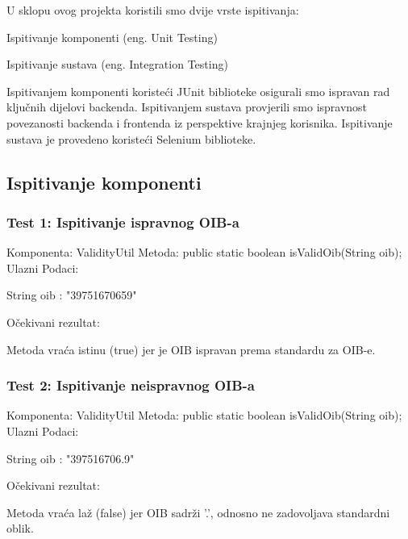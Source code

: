 			U sklopu ovog projekta koristili smo dvije vrste ispitivanja:
			\begin{packed_item}
				\item Ispitivanje komponenti (eng. Unit Testing)
				\item Ispitivanje sustava (eng. Integration Testing)
			\end{packed_item}
			
			
			Ispitivanjem komponenti koristeći JUnit biblioteke osigurali smo ispravan rad ključnih dijelovi backenda. Ispitivanjem sustava provjerili smo ispravnost povezanosti backenda i frontenda iz perspektive krajnjeg korisnika.
			Ispitivanje sustava je provedeno koristeći Selenium biblioteke.
			
			\subsection{Ispitivanje komponenti}
			\subsubsection*{Test 1: Ispitivanje ispravnog OIB-a}
			Komponenta: ValidityUtil \newline
			Metoda: public static boolean isValidOib(String oib); \newline
			Ulazni Podaci: 
			\begin{packed_item}
				\item String oib : "39751670659"
			\end{packed_item}
			Očekivani rezultat:
			\begin{packed_item}
				\item Metoda vraća istinu (true) jer je OIB ispravan prema standardu za OIB-e.
			\end{packed_item}
			

			\subsubsection*{Test 2: Ispitivanje neispravnog OIB-a}
			Komponenta: ValidityUtil \newline
			Metoda: public static boolean isValidOib(String oib); \newline
			Ulazni Podaci: 
			\begin{packed_item}
				\item String oib : "397516706.9"
			\end{packed_item}
			Očekivani rezultat:
			\begin{packed_item}
				\item Metoda vraća laž (false) jer OIB sadrži '.', odnosno ne zadovoljava standardni oblik.
			\end{packed_item}
			

